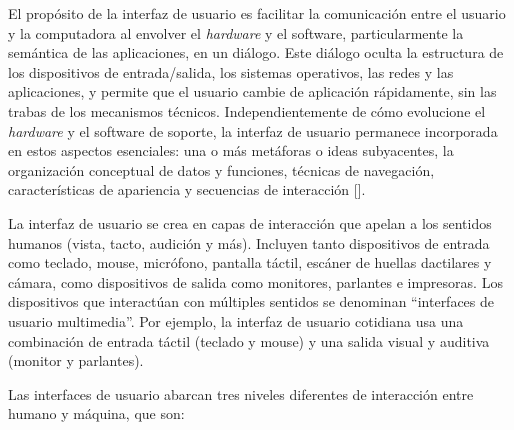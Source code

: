 
El propósito de la interfaz de usuario es facilitar la comunicación entre el usuario y la computadora al envolver el \textit{hardware} y el software, particularmente la semántica de las aplicaciones, en un diálogo. Este diálogo oculta la estructura de los dispositivos de entrada/salida, los sistemas operativos, las redes y las aplicaciones, y permite que el usuario cambie de aplicación rápidamente, sin las trabas de los mecanismos técnicos. Independientemente de cómo evolucione el \textit{hardware} y el software de soporte, la interfaz de usuario permanece incorporada en estos aspectos esenciales: una o más metáforas o ideas subyacentes, la organización conceptual de datos y funciones, técnicas de navegación, características de apariencia y secuencias de interacción [\cite{26}].

La interfaz de usuario se crea en capas de interacción que apelan a los sentidos humanos (vista, tacto, audición y más). Incluyen tanto dispositivos de entrada como teclado, mouse, micrófono, pantalla táctil, escáner de huellas dactilares y cámara, como dispositivos de salida como monitores, parlantes e impresoras. Los dispositivos que interactúan con múltiples sentidos se denominan ``interfaces de usuario multimedia''. Por ejemplo, la interfaz de usuario cotidiana usa una combinación de entrada táctil (teclado y mouse) y una salida visual y auditiva (monitor y parlantes).

Las interfaces de usuario abarcan tres niveles diferentes de interacción entre humano y máquina, que son:

